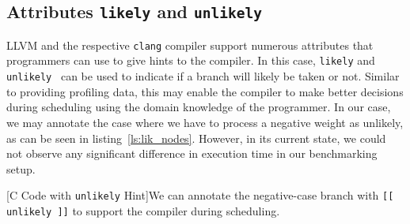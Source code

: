 \subsection{Attributes \texttt{likely} and \texttt{unlikely}}
LLVM and the respective \texttt{clang} compiler support numerous attributes that programmers can use to give hints to the compiler. In this case, \texttt{likely} and \texttt{unlikely}~\cite{clangsupportedsyntaxes} can be used to indicate if a branch will likely be taken or not. Similar to providing profiling data, this may enable the compiler to make better decisions during scheduling using the domain knowledge of the programmer. In our case, we may annotate the case where we have to process a negative weight as unlikely, as can be seen in listing~\ref{ls:lik_nodes}. However, in its current state, we could not observe any significant difference in execution time in our benchmarking setup. 
\begin{center}
        
        \captionsetup{type=listing}
        [C Code with \texttt{unlikely} Hint]{We can annotate the negative-case branch with \texttt{[[ unlikely ]]} to support the compiler during scheduling.}
        \label{ls:lik_nodes}
\end{center}
\newpage

